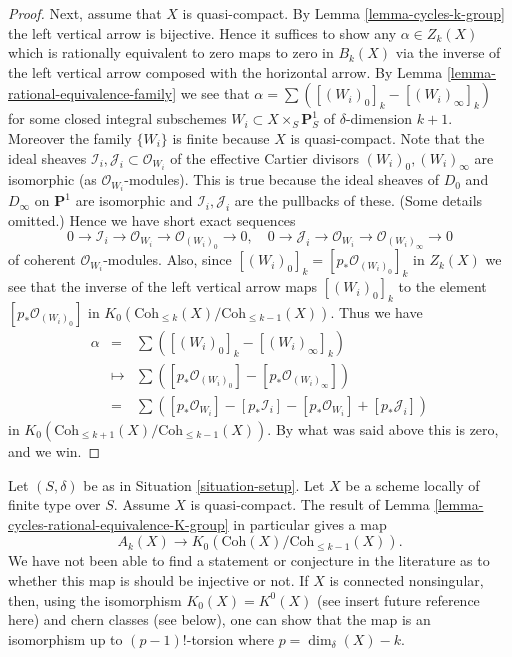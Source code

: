 \begin{proof}
\medskip\noindent
Next, assume that $X$ is quasi-compact. By Lemma \ref{lemma-cycles-k-group}
the left vertical arrow is bijective. Hence it suffices to show
any $\alpha \in Z_k(X)$ which is rationally equivalent to zero
maps to zero in $B_k(X)$ via the inverse of the left vertical
arrow composed with the horizontal arrow.
By Lemma \ref{lemma-rational-equivalence-family} we see that
$\alpha = \sum ([(W_i)_0]_k - [(W_i)_\infty]_k)$ for some
closed integral subschemes $W_i \subset X \times_S \mathbf{P}^1_S$
of $\delta$-dimension $k + 1$. Moreover the family
$\{W_i\}$ is finite because $X$ is quasi-compact.
Note that the ideal sheaves
$\mathcal{I}_i, \mathcal{J}_i \subset \mathcal{O}_{W_i}$
of the effective Cartier divisors $(W_i)_0, (W_i)_\infty$
are isomorphic (as $\mathcal{O}_{W_i}$-modules). This is true
because the ideal sheaves of $D_0$ and $D_\infty$ on $\mathbf{P}^1$
are isomorphic and $\mathcal{I}_i, \mathcal{J}_i$ are the pullbacks of
these. (Some details omitted.) Hence we have
short exact sequences
$$
0 \to \mathcal{I}_i \to \mathcal{O}_{W_i} \to \mathcal{O}_{(W_i)_0} \to 0,
\quad
0 \to \mathcal{J}_i \to \mathcal{O}_{W_i} \to \mathcal{O}_{(W_i)_\infty} \to 0
$$
of coherent $\mathcal{O}_{W_i}$-modules.
Also, since $[(W_i)_0]_k = [p_*\mathcal{O}_{(W_i)_0}]_k$ in
$Z_k(X)$ we see that the inverse of the left vertical arrow
maps $[(W_i)_0]_k$ to the element $[p_*\mathcal{O}_{(W_i)_0}]$ in
$K_0(\text{Coh}_{\leq k}(X)/\text{Coh}_{\leq k - 1}(X))$.
Thus we have
\begin{eqnarray*}
\alpha
& = &
\sum \left([(W_i)_0]_k - [(W_i)_\infty]_k\right) \\
& \mapsto &
\sum \left([p_*\mathcal{O}_{(W_i)_0}] - [p_*\mathcal{O}_{(W_i)_\infty}]\right)
\\
& = &
\sum \left([p_*\mathcal{O}_{W_i}] - [p_*\mathcal{I}_i]
- [p_*\mathcal{O}_{W_i}] + [p_*\mathcal{J}_i]\right)
\end{eqnarray*}
in $K_0(\text{Coh}_{\leq k + 1}(X)/\text{Coh}_{\leq k - 1}(X))$.
By what was said above this is zero, and we win.
\end{proof}

\begin{remark}
\label{remark-good-cases-K-A}
Let $(S, \delta)$ be as in Situation \ref{situation-setup}.
Let $X$ be a scheme locally of finite type over $S$.
Assume $X$ is quasi-compact.
The result of Lemma \ref{lemma-cycles-rational-equivalence-K-group}
in particular gives a map
$$
A_k(X)
\longrightarrow
K_0(\text{Coh}(X)/\text{Coh}_{\leq k - 1}(X)).
$$
We have not been able to find a statement or conjecture in the
literature as to whether this map is should be injective or not.
If $X$ is connected nonsingular, then, using the
isomorphism $K_0(X) = K^0(X)$ (see insert future reference here)
and chern classes (see below), one can show that
the map is an isomorphism up to $(p - 1)!$-torsion where
$p = \dim_\delta(X) - k$.
\end{remark}


















